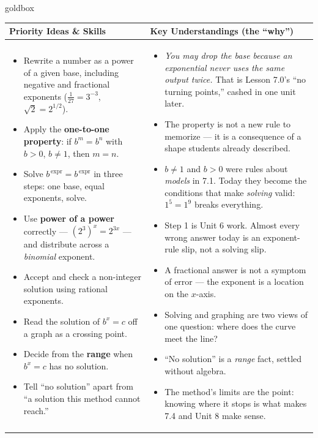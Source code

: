 \documentclass[10pt]{article}
\begin{document}
\renewcommand{\arraystretch}{1.4}
\begin{skillbox}{goldbox}
\begin{tabularx}{\linewidth}{@{}X|X@{}}
\textbf{Priority Ideas \& Skills} & \textbf{Key Understandings (the ``why'')} \\[2pt]
\hline
\vspace{-6pt}
\begin{itemize}[leftmargin=1.1em, nosep, after=\vspace{2pt}]
  \item Rewrite a number as a power of a given base, including negative and fractional exponents ($\frac{1}{27}=3^{-3}$, $\sqrt2=2^{1/2}$).
  \item Apply the \textbf{one-to-one property}: if $b^{m}=b^{n}$ with $b>0$, $b\neq1$, then $m=n$.
  \item Solve $b^{\,\text{expr}}=b^{\,\text{expr}}$ in three steps: one base, equal exponents, solve.
  \item Use \textbf{power of a power} correctly --- $\left(2^{3}\right)^{x}=2^{3x}$ --- and distribute across a \emph{binomial} exponent.
  \item Accept and check a non-integer solution using rational exponents.
  \item Read the solution of $b^{x}=c$ off a graph as a crossing point.
  \item Decide from the \textbf{range} when $b^{x}=c$ has no solution.
  \item Tell ``no solution'' apart from ``a solution this method cannot reach.''
\end{itemize}
&
\vspace{-6pt}
\begin{itemize}[leftmargin=1.1em, nosep, after=\vspace{2pt}]
  \item \emph{You may drop the base because an exponential never uses the same output twice.} That is Lesson 7.0's ``no turning points,'' cashed in one unit later.
  \item The property is not a new rule to memorize --- it is a consequence of a shape students already described.
  \item $b\neq1$ and $b>0$ were rules about \emph{models} in 7.1. Today they become the conditions that make \emph{solving} valid: $1^{5}=1^{9}$ breaks everything.
  \item Step 1 is Unit 6 work. Almost every wrong answer today is an exponent-rule slip, not a solving slip.
  \item A fractional answer is not a symptom of error --- the exponent is a location on the $x$-axis.
  \item Solving and graphing are two views of one question: where does the curve meet the line?
  \item ``No solution'' is a \emph{range} fact, settled without algebra.
  \item The method's limits are the point: knowing where it stops is what makes 7.4 and Unit 8 make sense.
\end{itemize}
\end{tabularx}
\end{skillbox}
\end{document}
